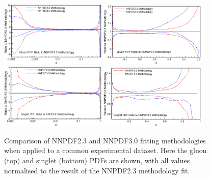 \clearpage
\begin{figure}[!]
\centering
\includegraphics[width=0.45\textwidth]{7-PostLHC/figs/30meth/plots/glulog.eps}
\includegraphics[width=0.45\textwidth]{7-PostLHC/figs/30meth/plots/glulin.eps}\\
\includegraphics[width=0.45\textwidth]{7-PostLHC/figs/30meth/plots/snglog.eps}
\includegraphics[width=0.45\textwidth]{7-PostLHC/figs/30meth/plots/snglin.eps}

\caption[Comparison of NNPDF2.3 and NNPDF3.0 fitting methodologies when applied to a common experimental dataset. Gluon and singlet PDF combinations]{Comparison of NNPDF2.3 and NNPDF3.0 fitting methodologies when applied to a common experimental dataset. Here the gluon (top) and singlet (bottom) PDFs are shown, with all values normalised to the result of the NNPDF2.3 methodology fit.}
\label{fig:23vs30methodology_1}
\end{figure}

